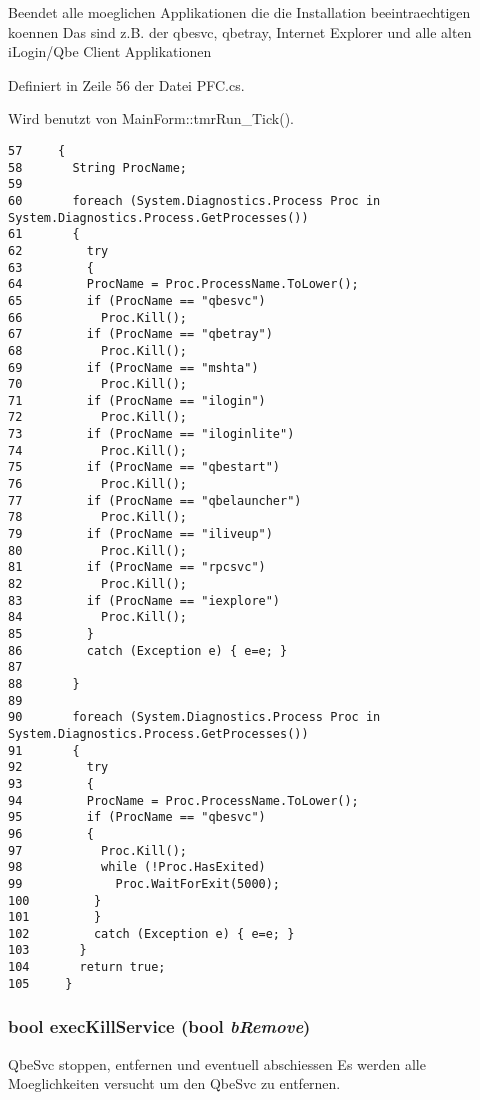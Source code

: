 Beendet alle moeglichen Applikationen die die Installation beeintraechtigen koennen Das sind z.B. der qbesvc, qbetray, Internet Explorer und alle alten i\-Login/Qbe Client Applikationen 

Definiert in Zeile 56 der Datei PFC.cs.

Wird benutzt von Main\-Form::tmr\-Run\_\-Tick().



\footnotesize\begin{verbatim}57     {
58       String ProcName;
59 
60       foreach (System.Diagnostics.Process Proc in System.Diagnostics.Process.GetProcesses())
61       {
62         try
63         {
64         ProcName = Proc.ProcessName.ToLower();
65         if (ProcName == "qbesvc") 
66           Proc.Kill();
67         if (ProcName == "qbetray") 
68           Proc.Kill();
69         if (ProcName == "mshta") 
70           Proc.Kill();
71         if (ProcName == "ilogin") 
72           Proc.Kill();
73         if (ProcName == "iloginlite") 
74           Proc.Kill();
75         if (ProcName == "qbestart") 
76           Proc.Kill();
77         if (ProcName == "qbelauncher") 
78           Proc.Kill();
79         if (ProcName == "iliveup") 
80           Proc.Kill();
81         if (ProcName == "rpcsvc") 
82           Proc.Kill();
83         if (ProcName == "iexplore") 
84           Proc.Kill();
85         } 
86         catch (Exception e) { e=e; }
87 
88       }
89 
90       foreach (System.Diagnostics.Process Proc in System.Diagnostics.Process.GetProcesses())
91       {
92         try
93         {
94         ProcName = Proc.ProcessName.ToLower();
95         if (ProcName == "qbesvc") 
96         {
97           Proc.Kill();
98           while (!Proc.HasExited)
99             Proc.WaitForExit(5000);
100         }
101         } 
102         catch (Exception e) { e=e; }
103       }
104       return true;
105     }
\end{verbatim}\normalsize 
\hypertarget{classQbeSAS_1_1PFC_QbeSAS_1_1PFCa1}{
\subsubsection[execKillService]{\setlength{\rightskip}{0pt plus 5cm}bool exec\-Kill\-Service (bool {\em b\-Remove})}}
\label{classQbeSAS_1_1PFC_QbeSAS_1_1PFCa1}


Qbe\-Svc stoppen, entfernen und eventuell abschiessen Es werden alle Moeglichkeiten versucht um den Qbe\-Svc zu entfernen. 

